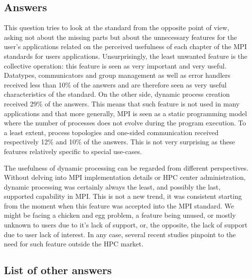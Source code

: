 
\subsection{Answers}



This question tries to look at the standard from the opposite point of view,
asking not about the missing parts but about the unnecessary features for the
user’s applications related on the perceived usefulness of each chapter of the
MPI standards for users applications. Unsurprisingly, the least unwanted feature
is the collective operation: this feature is seen as very important and very
useful. Datatypes, communicators and group management as well as  error handlers
received less than 10\% of the answers and are therefore seen as very useful
characteristics of the standard. On the other side, dynamic process creation
received 29\% of the answers. This means that such feature is not used in many
applications and that more generally, MPI is seen as a static programming model
where the number of processes does not evolve during the program execution. To a
least extent, process topologies and one-sided communication received
respectively 12\% and 10\% of the answers. This is not very surprising as these
features relatively specific to special use-cases.

The usefulness of dynamic processing can be regarded from different
perspectives. Without delving into MPI implementation details or HPC center
administration, dynamic processing was certainly always the least, and possibly
the last, supported capability in MPI. This is not a new trend, it was
consistent starting from the moment when this feature was accepted into the MPI
standard. We might be facing a chicken and egg problem, a feature being unused,
or mostly unknown to users due to it's lack of support, or, the opposite, the
lack of support due to user lack of interest. In any case, several recent
studies pinpoint to the need for such feature outside the HPC market.


\subsection{List of other answers}
\begin{itemize}

\end{itemize}

